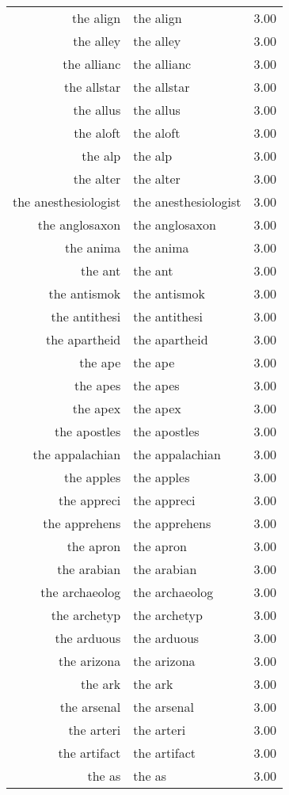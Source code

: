 \begin{table}[ht]
\begin{tabular}{rlr}
  the align & the align & 3.00 \\ 
  the alley & the alley & 3.00 \\ 
  the allianc & the allianc & 3.00 \\ 
  the allstar & the allstar & 3.00 \\ 
  the allus & the allus & 3.00 \\ 
  the aloft & the aloft & 3.00 \\ 
  the alp & the alp & 3.00 \\ 
  the alter & the alter & 3.00 \\ 
  the anesthesiologist & the anesthesiologist & 3.00 \\ 
  the anglosaxon & the anglosaxon & 3.00 \\ 
  the anima & the anima & 3.00 \\ 
  the ant & the ant & 3.00 \\ 
  the antismok & the antismok & 3.00 \\ 
  the antithesi & the antithesi & 3.00 \\ 
  the apartheid & the apartheid & 3.00 \\ 
  the ape & the ape & 3.00 \\ 
  the apes & the apes & 3.00 \\ 
  the apex & the apex & 3.00 \\ 
  the apostles & the apostles & 3.00 \\ 
  the appalachian & the appalachian & 3.00 \\ 
  the apples & the apples & 3.00 \\ 
  the appreci & the appreci & 3.00 \\ 
  the apprehens & the apprehens & 3.00 \\ 
  the apron & the apron & 3.00 \\ 
  the arabian & the arabian & 3.00 \\ 
  the archaeolog & the archaeolog & 3.00 \\ 
  the archetyp & the archetyp & 3.00 \\ 
  the arduous & the arduous & 3.00 \\ 
  the arizona & the arizona & 3.00 \\ 
  the ark & the ark & 3.00 \\ 
  the arsenal & the arsenal & 3.00 \\ 
  the arteri & the arteri & 3.00 \\ 
  the artifact & the artifact & 3.00 \\ 
  the as & the as & 3.00 \\ 

\end{tabular}
\end{table}
